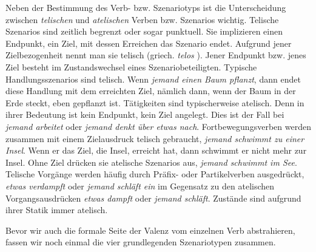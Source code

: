 Neben der Bestimmung des Verb- bzw. Szenariotyps ist die Unterscheidung zwischen \textit{telischen} und \textit{atelischen} Verben bzw. Szenarios wichtig. Telische Szenarios sind zeitlich begrenzt oder sogar punktuell. Sie implizieren einen Endpunkt, ein Ziel, mit dessen Erreichen das Szenario endet. Aufgrund jener Zielbezogenheit nennt man sie telisch (griech. \textit{telos} ). Jener Endpunkt bzw. jenes Ziel besteht im Zustandswechsel eines Szenariobeteiligten. Typische Handlungsszenarios sind telisch. Wenn \textit{jemand einen Baum pflanzt}, dann endet diese Handlung mit dem erreichten Ziel, nämlich dann, wenn der Baum in der Erde steckt, eben gepflanzt ist. Tätigkeiten sind typischerweise atelisch. Denn in ihrer Bedeutung ist kein Endpunkt, kein Ziel angelegt. Dies ist der Fall bei \textit{jemand arbeitet} oder \textit{jemand denkt über etwas nach}. Fortbewegungsverben werden zusammen mit einem Zielausdruck telisch gebraucht, \zB \textit{jemand schwimmt zu einer Insel}. Wenn er das Ziel, die Insel, erreicht hat, dann schwimmt er nicht mehr zur Insel. Ohne Ziel drücken sie atelische Szenarios aus, \zB \textit{jemand schwimmt im See}. Telische Vorgänge werden häufig durch Präfix- oder Partikelverben ausgedrückt, \zB \textit{etwas verdampft} oder \textit{jemand schläft ein} im Gegensatz zu den atelischen Vorgangsausdrücken \textit{etwas dampft} oder \textit{jemand schläft}. Zustände sind aufgrund ihrer Statik immer atelisch.


Bevor wir auch die formale Seite der Valenz vom einzelnen Verb abstrahieren, fassen wir noch einmal die vier grundlegenden Szenariotypen zusammen.

